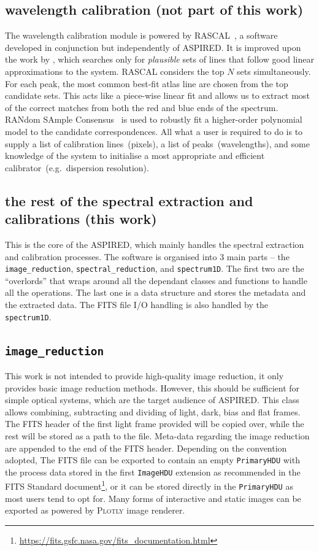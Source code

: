 \documentclass[fleqn,usenatbib]{mnras}
\begin{document}
\subsection*{wavelength calibration (not part of this work)}
The wavelength calibration module is powered by
\textsc{RASCAL}~\citep{2020zndo...4117517V, 2020ASPC..527..627V}, a software
developed in conjunction but independently of \textsc{ASPIRED}. It is improved
upon the work by \citet{2018ApOpt..57.6876S}, which searches only for
\textit{plausible} sets of lines that follow good linear approximations to the
system. \textsc{RASCAL} considers the top $N$ sets simultaneously. For each
peak, the most common best-fit atlas line are chosen from the top candidate
sets. This acts like a piece-wise linear fit and allows us to extract most of
the correct matches from both the red and blue ends of the spectrum. RANdom
SAmple Consensus~\citep[RANSAC,][]{fischler_bolles_1981} is used to robustly
fit a higher-order polynomial model to the candidate correspondences. All what
a user is required to do is to supply a list of calibration lines~(pixels), a
list of peaks~(wavelengths), and some knowledge of the system to initialise a
most appropriate and efficient calibrator~(e.g.\ dispersion resolution).

\subsection*{the rest of the spectral extraction and calibrations (this work)}
This is the core of the \textsc{ASPIRED}, which mainly handles the spectral
extraction and calibration processes. The software is organised into
3 main parts -- the \texttt{image\_reduction}, \texttt{spectral\_reduction},
and \texttt{spectrum1D}. The first two are the ``overlords'' that wraps
around all the dependant classes and functions to handle all the operations.
The last one is a data structure and stores the metadata and the extracted
data. The FITS file I/O handling is also handled by the \texttt{spectrum1D}.

\subsection*{\texttt{image\_reduction}}
This work is not intended to provide high-quality image reduction, it only
provides basic image reduction methods. However, this should be sufficient
for simple optical systems, which are the target audience of \textsc{ASPIRED}.
This class allows combining, subtracting and dividing of light, dark, bias
and flat frames. The FITS header of the first light frame provided will be
copied over, while the rest will be stored as a path to the file. Meta-data
regarding the image reduction are appended to the end of the FITS header.
Depending on the convention adopted, The FITS file can be exported to contain
an empty \texttt{PrimaryHDU} with the process data stored in the first
\texttt{ImageHDU} extension as recommended in the FITS Standard
document\footnote{\url{https://fits.gsfc.nasa.gov/fits_documentation.html}},
or it can be stored directly in the \texttt{PrimaryHDU} as most users tend
to opt for. Many forms of interactive and static images can be exported as
powered by \textsc{Plotly} image renderer.
\end{document}
